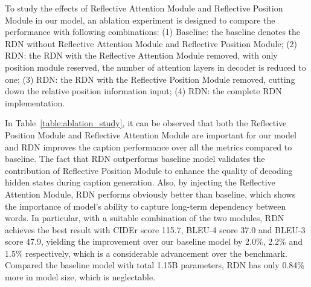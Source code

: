 \documentclass[10pt,twocolumn,letterpaper]{article}
\begin{document}
To study the effects of Reflective Attention Module and Reflective Position Module in our model, an ablation experiment is designed to compare the performance with following combinations:
(1) Baseline: the baseline denotes the RDN without Reflective Attention Module and Reflective Position Module;
(2) RDN: the RDN with the Reflective Attention Module removed, with only position module reserved, the number of attention layers in decoder is reduced to one;
(3) RDN: the RDN with the Reflective Position Module removed, cutting down the relative position information input;
(4) RDN: the complete RDN implementation.

In Table~\ref{table:ablation_study}, it can be observed that both the Reflective Position Module and Reflective Attention Module are important for our model and RDN improves the caption performance over all the metrics compared to baseline.
The fact that RDN outperforms baseline model validates the contribution of Reflective Position Module to enhance the quality of decoding hidden states during caption generation.
Also, by injecting the Reflective Attention Module, RDN performs obviously better than baseline, which shows the importance of model's ability to capture long-term dependency between words.
In particular, with a suitable combination of the two modules, RDN achieves the best result with CIDEr score 115.7, BLEU-4 score 37.0 and BLEU-3 score 47.9, yielding the improvement over our baseline model by 2.0\%, 2.2\% and 1.5\% respectively, which is a considerable advancement over the benchmark. 
Compared the baseline model with total 1.15B parameters, RDN has only 0.84\% more in model size, which is neglectable.

\iffalse 
\paragraph{Study on spatial ConvNet feature.}
Our RDN substantially outperforms the baseline model which also utilizes Faster-RCNN to extract visual features.
To erase the concern of our RDN's effectiveness on spatial convolutional feature extraction methods without object detection module, we conduct experiments to directly apply our RDN to utilize spatial ConvNet features (204877) extracted from the last layer of ResNet.
Table~\ref{tab:result} shows that our RDN can also improve ConvNet feature based captioning system.


Table \ref{table:spice} presents the ablation study for breakdown of SPICE F-scores. 
Compared to the baseline, our RDN improves the performance over various aspects, i.e., in terms of identifying identifying objects, object count and size.
\fi
\end{document}
